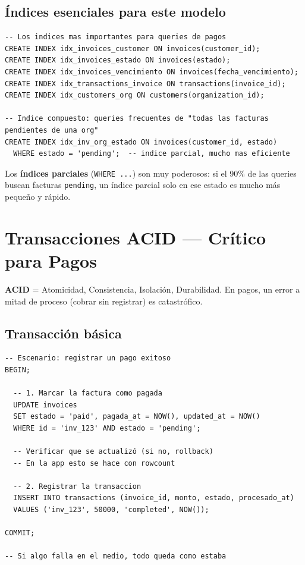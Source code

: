 \documentclass[11pt,a4paper]{article}
\begin{document}
\subsection{Índices esenciales para este modelo}

\begin{lstlisting}[style=sql]
-- Los indices mas importantes para queries de pagos
CREATE INDEX idx_invoices_customer ON invoices(customer_id);
CREATE INDEX idx_invoices_estado ON invoices(estado);
CREATE INDEX idx_invoices_vencimiento ON invoices(fecha_vencimiento);
CREATE INDEX idx_transactions_invoice ON transactions(invoice_id);
CREATE INDEX idx_customers_org ON customers(organization_id);

-- Indice compuesto: queries frecuentes de "todas las facturas pendientes de una org"
CREATE INDEX idx_inv_org_estado ON invoices(customer_id, estado)
  WHERE estado = 'pending';  -- indice parcial, mucho mas eficiente
\end{lstlisting}

\begin{tipbox}
Los \textbf{índices parciales} (\texttt{WHERE ...}) son muy poderosos: si el 90\% de las queries
buscan facturas \texttt{pending}, un índice parcial solo en ese estado es mucho más pequeño y rápido.
\end{tipbox}

\section{Transacciones ACID — Crítico para Pagos}

\begin{tcolorbox}[colback=pgblue!5,colframe=pgblue]
\textbf{ACID} = Atomicidad, Consistencia, Isolación, Durabilidad.
En pagos, un error a mitad de proceso (cobrar sin registrar) es catastrófico.
\end{tcolorbox}

\subsection{Transacción básica}

\begin{lstlisting}[style=sql]
-- Escenario: registrar un pago exitoso
BEGIN;

  -- 1. Marcar la factura como pagada
  UPDATE invoices
  SET estado = 'paid', pagada_at = NOW(), updated_at = NOW()
  WHERE id = 'inv_123' AND estado = 'pending';

  -- Verificar que se actualizó (si no, rollback)
  -- En la app esto se hace con rowcount

  -- 2. Registrar la transaccion
  INSERT INTO transactions (invoice_id, monto, estado, procesado_at)
  VALUES ('inv_123', 50000, 'completed', NOW());

COMMIT;

-- Si algo falla en el medio, todo queda como estaba
\end{lstlisting}
\end{document}
